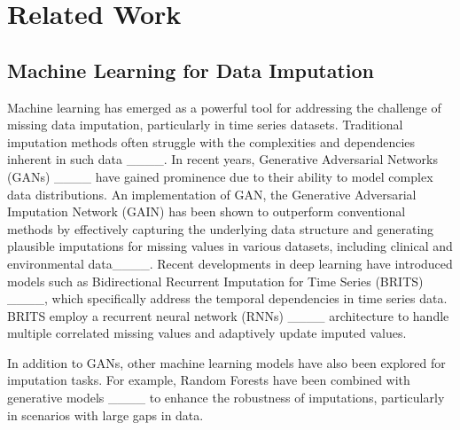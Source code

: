 \section{Related Work}
\subsection{Machine Learning for Data Imputation }
 

Machine learning has emerged as a powerful tool for addressing the challenge of missing data imputation, particularly in time series datasets. Traditional imputation methods often struggle with the complexities and dependencies inherent in such data ____.  In recent years, Generative Adversarial Networks (GANs) ____ have gained prominence due to their ability to model complex data distributions. An implementation of GAN, the Generative Adversarial Imputation Network (GAIN) has been shown to outperform conventional methods by effectively capturing the underlying data structure and generating plausible imputations for missing values in various datasets, including clinical and environmental data____. Recent developments in deep learning have introduced models such as Bidirectional Recurrent Imputation for Time Series (BRITS) ____, which specifically address the temporal dependencies in time series data. BRITS employ a recurrent neural network (RNNs) ____ architecture to handle multiple correlated missing values and adaptively update imputed values.

In addition to GANs, other machine learning models have also been explored for imputation tasks. For example, Random Forests have been combined with generative models ____ to enhance the robustness of imputations, particularly in scenarios with large gaps in data. 




